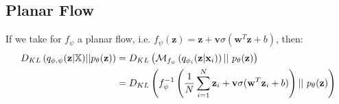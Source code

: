 \documentclass[english]{article}
\begin{document}
    \subsection*{Planar Flow}
    If we take for $f_{\psi}$ a planar flow, i.e. $f_{\psi}(\textbf{z}) = \textbf{z} + \textbf{v}\sigma (\textbf{w}^T\textbf{z} + b)$, then:
    \begin{equation}
    \begin{split}
               D_{KL} \left( q_{\phi, \psi}(\textbf{z}|\mathbb{X}) || p_{\theta}(\textbf{z}) \right) &=D_{KL} \left( \mathcal{M}_{f_{\psi}}\left( q_{\phi _i}(\textbf{z}|\textbf{x}_i) \right) ||\ p_{\theta}(\textbf{z}) \right)\\
               &=D_{KL} \left(f_{\psi}^{-1}\left( \frac{1}{N} \sum ^N _{i=1} \textbf{z}_i +\textbf{v} \sigma (\textbf{w}^T \textbf{z}_i +b) \right) ||\ p_{\theta}(\textbf{z}) \right) 
    \end{split}
    \end{equation}
    
\newpage

\printbibliography
\end{document}

